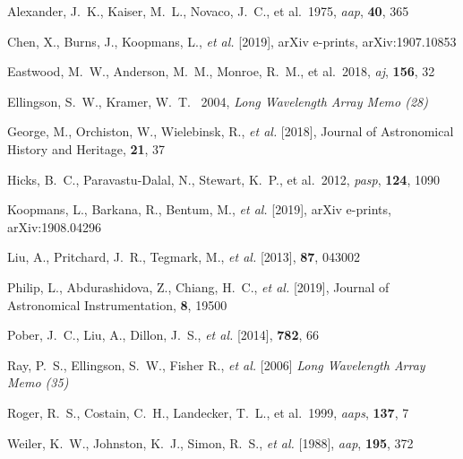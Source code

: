 \documentclass{ws-jai}
\begin{document}
	
\begin{thebibliography}{9}

 Alexander, J.~K., Kaiser, M.~L., Novaco, J.~C., et al.\ 1975, {\it aap\/}, {\bf 40}, 365

 Chen, X., Burns, J., Koopmans, L., {\it et al.} [2019], arXiv e-prints, arXiv:1907.10853

 Eastwood, M.~W., Anderson, M.~M., Monroe, R.~M., et al.\ 2018, {\it aj\/}, {\bf 156}, 32

 Ellingson, S.~W., {Kramer}, W.~T. \ 2004, {\it Long Wavelength Array Memo (28)}

 George, M., Orchiston, W., Wielebinsk, R., {\it et al.} [2018], Journal of Astronomical History and Heritage, {\bf 21}, 37

 Hicks, B.~C., Paravastu-Dalal, N., Stewart, K.~P., et al.\ 2012, {\it pasp\/}, {\bf 124}, 1090

 Koopmans, L., Barkana, R., Bentum, M., {\it et al.} [2019], arXiv e-prints, arXiv:1908.04296

 Liu, A., Pritchard, J.~R., Tegmark, M., {\it et al.} [2013], {\bf 87}, 043002

 Philip, L., Abdurashidova, Z., Chiang, H.~C., {\it et al.} [2019], Journal of Astronomical Instrumentation, {\bf 8}, 19500

 Pober, J.~C., Liu, A., Dillon, J.~S., {\it et al.} [2014], {\bf 782}, 66

 Ray, P.~S., Ellingson, S.~W., Fisher R., {\it et al.} [2006] {\it Long Wavelength Array Memo (35)}

 Roger, R.~S., Costain, C.~H., Landecker, T.~L., et al.\ 1999, {\it aaps\/}, {\bf 137}, 7

 Weiler, K.~W., Johnston, K.~J., Simon, R.~S., {\it et al.} [1988], {\it aap\/}, {\bf 195}, 372






\end{thebibliography}
\end{document}
